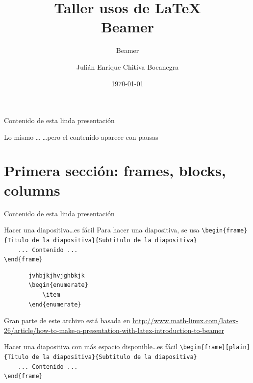 \documentclass[dvipsnames,xcolor=x11names]{beamer}
\title{Taller usos de \LaTeX \\ \small{Beamer} \vspace*{-0.2cm}}
\subtitle{Beamer}
\author[Julián Chitiva Bocanegra]{Julián Enrique Chitiva Bocanegra}
\institute[Uniandes] 
{Universidad de los Andes\\ Facultad de Economía}
\date{\today}
\theoremstyle{plain}
\theoremstyle{definition}
\begin{document}
\begin{frame}
  \titlepage
\end{frame}

\begin{frame}{Contenido de esta linda presentaci\'on}
  \tableofcontents
\end{frame}

\begin{frame}{Lo mismo \dots}
  \dots pero el contenido aparece con pausas
  \tableofcontents[pausesections]
\end{frame}

\section{Primera secci\'on: frames, blocks, columns} %
\begin{frame}{Contenido de esta linda presentaci\'on}
  \tableofcontents[currentsection]
\end{frame}
\begin{frame}[fragile]{Hacer una diapositiva}{\dots es f\'acil}
   Para hacer una diapositiva, se usa
   \verb+\begin{frame}{Titulo de la diapositiva}{Subtitulo de la diapositiva}+\\
      \verb+    ... Contenido ... +\\
   \verb+\end{frame}+
   
   \begin{verbatim}
       jvhbjkjhvjghbkjk
       \begin{enumerate}
           \item 
       \end{enumerate}
   \end{verbatim}
   \bigskip
   \bigskip

   Gran parte de este archivo est\'a basada en 
   \href{http://www.math-linux.com/latex-26/article/how-to-make-a-presentation-with-latex-introduction-to-beamer}{http://www.math-linux.com/latex-26/article/how-to-make-a-presentation-with-latex-introduction-to-beamer}
\end{frame}

\begin{frame}{Hacer una diapositiva con m\'as espacio disponible}{\dots es f\'acil}
   \verb+\begin{frame}+{\color{red}\verb+[plain]+}\verb+{Titulo de la diapositiva}{Subtitulo de la diapositiva}+\\
      \verb+    ... Contenido ... +\\
   \verb+\end{frame}+
\end{frame}
\end{document}
